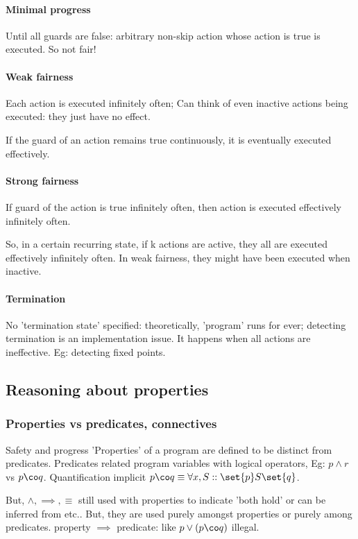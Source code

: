 \documentclass[oneside, article]{memoir}
\begin{document}
\paragraph*{Minimal progress}
Until all guards are false: arbitrary non-skip action whose action is true is executed. So not fair!   

\paragraph*{Weak fairness}
Each action is executed infinitely often; Can think of even inactive actions being executed: they just have no effect.

If the guard of an action remains true continuously, it is eventually executed effectively.

\paragraph*{Strong fairness}
If guard of the action is true infinitely often, then action is executed effectively infinitely often.

So, in a certain recurring state, if k actions are active, they all are executed effectively infinitely often. In weak fairness, they might have been executed when inactive.

\paragraph*{Termination}
No 'termination state' specified: theoretically, 'program' runs for ever; detecting termination is an implementation issue. It happens when all actions are ineffective. Eg: detecting fixed points.

\subsection{Reasoning about properties}
\subsubsection{Properties vs predicates, connectives}
Safety and progress 'Properties' of a program are defined to be distinct from predicates. Predicates related program variables with logical operators, Eg: $p \land r$ vs $p \co q$. Quantification implicit $p \co q \equiv \forall x, S:: \set{p} S \set{q}$.

But, $\land, \implies, \equiv$ still used with properties to indicate 'both hold' or can be inferred from etc.. But, they are used purely amongst properties or purely among predicates. property $\implies$ predicate: like $p \lor (p \co q)$ illegal.
\end{document}
